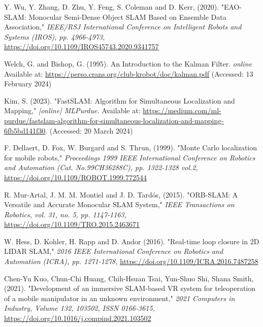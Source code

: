 \documentclass[12pt]{article}
\begin{document}
\begin{thebibliography}{9}
    Y. Wu, Y. Zhang, D. Zhu, Y. Feng, S. Coleman and D. Kerr, (2020). "EAO-SLAM: Monocular Semi-Dense Object SLAM Based on Ensemble Data Association,"
    \textit{IEEE/RSJ International Conference on Intelligent Robots and Systems (IROS), pp. 4966-4973},
    \href{https://doi.org/10.1109/IROS45743.2020.9341757}{https://doi.org/10.1109/IROS45743.2020.9341757}

    Welch, G. and Bishop, G. (1995). An Introduction to the Kalman Filter.
    \textit{online}
    Available at: \href{https://perso.crans.org/club-krobot/doc/kalman.pdf}{https://perso.crans.org/club-krobot/doc/kalman.pdf} (Accessed: 13 February 2024)

    Kim, S. (2023). "FastSLAM: Algorithm for Simultaneous Localization and Mapping,"
    \textit{[online] MLPurdue.}
    Available at: \href{https://medium.com/ml-purdue/fastslam-algorithm-for-simultaneous-localization-and-mapping-6fb5bd141f30}{https://medium.com/ml-purdue/fastslam-algorithm-for-simultaneous-localization-and-mapping-6fb5bd141f30}. (Accessed: 20 March 2024)

    F. Dellaert, D. Fox, W. Burgard and S. Thrun, (1999). "Monte Carlo localization for mobile robots,"
    \textit{Proceedings 1999 IEEE International Conference on Robotics and Automation (Cat. No.99CH36288C), pp. 1322-1328 vol.2,}
    \href{https://doi.org/10.1109/ROBOT.1999.772544}{https://doi.org/10.1109/ROBOT.1999.772544}

    R. Mur-Artal, J. M. M. Montiel and J. D. Tardós, (2015). "ORB-SLAM: A Versatile and Accurate Monocular SLAM System,"
    \textit{IEEE Transactions on Robotics, vol. 31, no. 5, pp. 1147-1163,}
    \href{https://doi.org/10.1109/TRO.2015.2463671}{https://doi.org/10.1109/TRO.2015.2463671}

    W. Hess, D. Kohler, H. Rapp and D. Andor (2016). "Real-time loop closure in 2D LIDAR SLAM,"
    \textit{2016 IEEE International Conference on Robotics and Automation (ICRA), pp. 1271-1278,}
    \href{https://doi.org/10.1109/ICRA.2016.7487258}{https://doi.org/10.1109/ICRA.2016.7487258}

    Chen-Yu Kuo, Chun-Chi Huang, Chih-Hsuan Tsai, Yun-Shuo Shi, Shana Smith, (2021). "Development of an immersive SLAM-based VR system for teleoperation of a mobile manipulator in an unknown environment,"
    \textit{2021 Computers in Industry, Volume 132, 103502, ISSN 0166-3615,}
    \href{https://doi.org/10.1016/j.compind.2021.103502}{https://doi.org/10.1016/j.compind.2021.103502}


\end{thebibliography}
\end{document}
